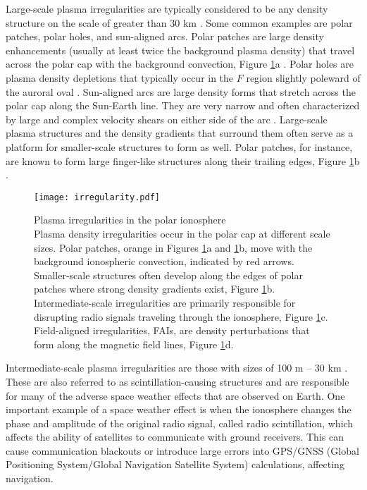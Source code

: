 Large-scale plasma irregularities are typically considered to be any density structure on the scale of greater than 30 km \citep{Kelley2009}.  Some common examples are polar patches, polar holes, and sun-aligned arcs.  Polar patches are large density enhancements (usually at least twice the background plasma density) that travel across the polar cap with the background convection, Figure \ref{fig:polarirreg}a \citep{Weber1984,Valladares1994}.  Polar holes are plasma density depletions that typically occur in the \(F\) region slightly poleward of the auroral oval \citep{Brinton1978}.  Sun-aligned arcs are large density forms that stretch across the polar cap along the Sun-Earth line.  They are very narrow and often characterized by large and complex velocity shears on either side of the arc \citep{Valladares1991}.  Large-scale plasma structures and the density gradients that surround them often serve as a platform for smaller-scale structures to form as well.  Polar patches, for instance, are known to form large finger-like structures along their trailing edges, Figure \ref{fig:polarirreg}b \citep{Gondarenko2004b,Hosokawa2016}.

\begin{figure}
	\centering
	\texttt{[image: irregularity.pdf]}
	\caption[Plasma irregularities in the polar ionosphere]{{\:}Plasma irregularities in the polar ionosphere\\ Plasma density irregularities occur in the polar cap at different scale sizes.  Polar patches, orange in Figures \ref{fig:polarirreg}a and \ref{fig:polarirreg}b, move with the background ionospheric convection, indicated by red arrows.  Smaller-scale structures often develop along the edges of polar patches where strong density gradients exist, Figure \ref{fig:polarirreg}b.  Intermediate-scale irregularities are primarily responsible for disrupting radio signals traveling through the ionosphere, Figure \ref{fig:polarirreg}c.  Field-aligned irregularities, FAIs, are density perturbations that form along the magnetic field lines, Figure \ref{fig:polarirreg}d.}
	\label{fig:polarirreg}
\end{figure}

Intermediate-scale plasma irregularities are those with sizes of 100 m -- 30 km \citep{Kelley2009}.  These are also referred to as scintillation-causing structures and are responsible for many of the adverse space weather effects that are observed on Earth.  One important example of a space weather effect is when the ionosphere changes the phase and amplitude of the original radio signal, called radio scintillation, which affects the ability of satellites to communicate with ground receivers.  This can cause communication blackouts or introduce large errors into GPS/GNSS (Global Positioning System/Global Navigation Satellite System) calculations, affecting navigation.

